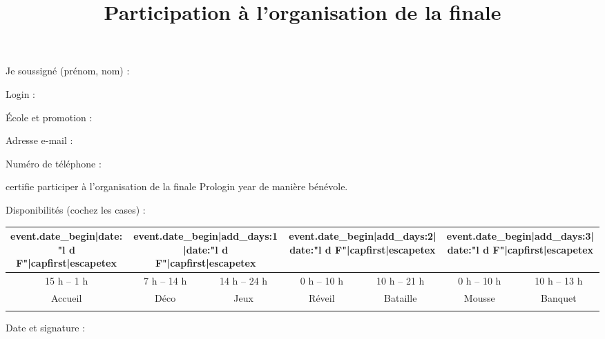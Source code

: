 \documentclass[a4paper,11pt]{prologin}
\title{Participation à l'organisation de la finale}
\begin{document}
Je soussigné (prénom, nom) : \hrulefill

Login : \hrulefill

École et promotion : \hrulefill

Adresse e-mail : \hrulefill

Numéro de téléphone : \hrulefill

certifie participer à l'organisation de la finale Prologin {{ year }} de
manière bénévole.

Disponibilités (cochez les cases) :

\begin{center}
\begin{tabular}{|c|c|c|c|c|c|c|}
\hline

{{ event.date_begin|date:"l d F"|capfirst|escapetex }} &
\multicolumn{2}{c|}{ {{ event.date_begin|add_days:1|date:"l d F"|capfirst|escapetex }} } &
\multicolumn{2}{c|}{ {{ event.date_begin|add_days:2|date:"l d F"|capfirst|escapetex }} } &
\multicolumn{2}{c|}{ {{ event.date_begin|add_days:3|date:"l d F"|capfirst|escapetex }} }
\tabularnewline
\hline
15 h -- 1 h & 7 h -- 14 h & 14 h -- 24 h & 0 h -- 10 h & 10 h -- 21 h &
0 h -- 10 h & 10 h -- 13 h\tabularnewline
\hline
Accueil & Déco & Jeux & Réveil & Bataille & Mousse & Banquet\tabularnewline
\hline
&&&&&&\tabularnewline
\hline
\end{tabular}
\end{center}

Date et signature :
\end{document}
